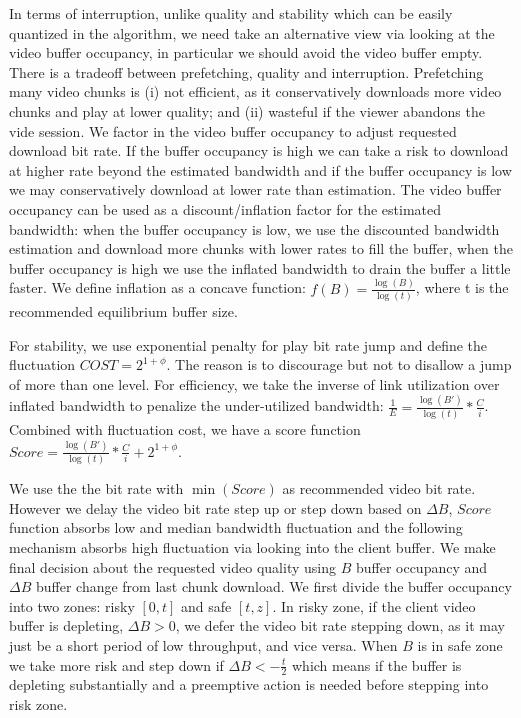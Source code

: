 In terms of interruption, unlike quality and stability which can be easily quantized in the algorithm, we need take an alternative view via looking at the video buffer occupancy, in particular we should avoid the video buffer empty. There is a tradeoff between prefetching, quality and interruption. Prefetching many video chunks is (i) not efficient, as it conservatively downloads more video chunks and play at lower quality; and (ii) wasteful if the viewer abandons the vide session. We factor in the video buffer occupancy to adjust requested download bit rate. If the buffer occupancy is high we can take a risk to download at higher rate beyond the estimated bandwidth and if the buffer occupancy is low we may conservatively download at lower rate than estimation. The video buffer occupancy can be used as a discount/inflation factor for the estimated bandwidth: when the buffer occupancy is low, we use the discounted bandwidth estimation and download more chunks with lower rates to fill the buffer, when the buffer occupancy is high we use the inflated bandwidth to drain the buffer a little faster. We define inflation as a concave function: $f(B)= \frac{\log(B)}{\log (t)}$, where t is the recommended equilibrium buffer size.  

For stability, we use exponential penalty for play bit rate jump and define the fluctuation $COST = 2^{1+\phi}$. The reason is to discourage but not to disallow a jump of more than one level. For efficiency, we take the inverse of link utilization over inflated bandwidth to penalize the under-utilized bandwidth: $\frac{1}{E} = \frac{\log(B')}{\log (t)}*\frac{C}{i} $. Combined with fluctuation cost, we have a score function $Score= \frac{\log(B')}{\log (t)}*\frac{C}{i} +  2^{1+\phi} $. 


We use the the bit rate with $\min(Score)$ as recommended video bit rate. However we delay the video bit rate step up or step down based on $\Delta B$, $Score$ function absorbs low and median bandwidth fluctuation and the following mechanism absorbs high fluctuation via looking into the client buffer. We make final decision about the requested video quality using $B$ buffer occupancy and $\Delta B$ buffer change from last chunk download.  We first divide the buffer occupancy into two zones: risky $[0,t]$ and safe $[t,z]$. In risky zone, if the client video buffer is depleting, $\Delta B>0$, we defer the video bit rate stepping down, as it may just be a short period of low throughput, and vice versa. When $B$ is in safe zone we take more risk and step down if $\Delta B <-\frac{t}{2}$ which means if the buffer is depleting substantially and a preemptive action is needed before stepping into risk zone. 
  
